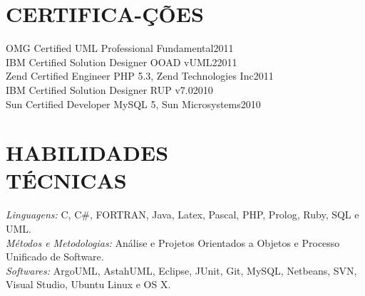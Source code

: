 \documentclass[margin, 10pt]{res}
\begin{document}
\begin{resume}
  \section{CERTIFICA-ÇÕES} 
  OMG Certified UML Professional Fundamental\hfill 2011 \\
  IBM Certified Solution Designer OOAD vUML2\hfill 2011 \\
  Zend Certified Engineer PHP 5.3, Zend Technologies Inc\hfill 2011 \\
  IBM Certified Solution Designer RUP v7.0\hfill 2010 \\
  Sun Certified Developer MySQL 5, Sun Microsystems\hfill 2010 \\
  
  \section{HABILIDADES \\ TÉCNICAS} 
  {\sl Linguagens:} C, C$\#$, FORTRAN, Java, Latex, Pascal, PHP, Prolog,  Ruby, SQL e UML. \\
  {\sl Métodos e Metodologias:} Análise e Projetos Orientados a Objetos e Processo Unificado de Software.\\
  {\sl Softwares:} ArgoUML, AstahUML, Eclipse, JUnit, Git, MySQL, Netbeans, SVN, Visual Studio, Ubuntu Linux e OS X.\\

  
\end{resume}
\end{document}

